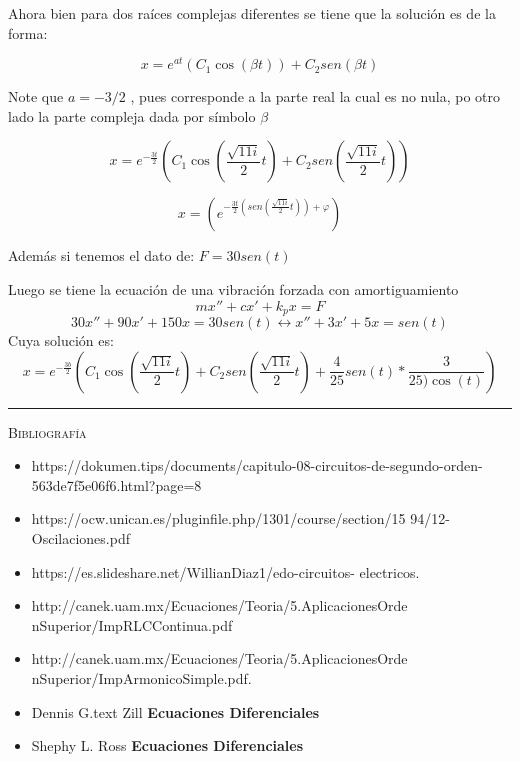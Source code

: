 \documentclass[oneside,12pt]{report}
\begin{document}
Ahora bien para dos  raíces complejas diferentes se tiene que  la solución es de la forma:

$$x=e^{at}\left( C_1 \cos(\beta t)\right) +C_2 sen\left( \beta t\right) $$

Note que   $a=-3/2$  , pues corresponde a la parte real la cual es  no nula,  po otro lado  la parte compleja  dada por símbolo  $\beta$

\begin{equation}
	x=e^{-\frac{3t}{2}}\left( C_1\cos\left( \frac{\sqrt{11i}}{2}t\right) +C_2 sen\left( \frac{\sqrt{11i}}{2}t\right) \right) 
\end{equation}

\begin{equation}
	x=\left( e^{-\frac{3t}{2} (sen(\frac{\sqrt{11i}}{2}t) )+\varphi}\right) 
\end{equation}
	
Además si tenemos el dato de:
 $F=30 sen(t)$

Luego se tiene la ecuación de una vibración forzada con  amortiguamiento 
\begin{equation}
	mx''+cx'+k_px=F
\end{equation}
\begin{equation}
	30x''+90x'+150x=30sen(t)\leftrightarrow x''+3x'+5x=sen(t)
\end{equation}
Cuya solución es:
\begin{equation}
	x=e^{-\frac{3b}{2}}\left( C_1\cos\left( \frac{\sqrt{11i}}{2}t\right) +C_2 sen\left( \frac{\sqrt{11i}}{2}t\right) +\frac{4}{25}sen(t)*\frac{3}{25)\cos(t)}\right) 
\end{equation}
\newpage
\thispagestyle{empty}\bigskip
\begin{center}\rule{0.9\textwidth}{0.1mm} \end{center}
{\sf
	\begin{center}
		\Large \textsc{Bibliografía}%
	\end{center}
}\bigskip
{\small \begin{itemize}
	\item https://dokumen.tips/documents/capitulo-08-circuitos-de-segundo-orden-563de7f5e06f6.html?page=8
	\item https://ocw.unican.es/pluginfile.php/1301/course/section/15 94/12-Oscilaciones.pdf
	\item https://es.slideshare.net/WillianDiaz1/edo-circuitos- electricos.
	\item 	http://canek.uam.mx/Ecuaciones/Teoria/5.AplicacionesOrde nSuperior/ImpRLCContinua.pdf
	\item http://canek.uam.mx/Ecuaciones/Teoria/5.AplicacionesOrde nSuperior/ImpArmonicoSimple.pdf.
	\item Dennis G.text Zill \textbf{Ecuaciones Diferenciales} 
	\item Shephy L. Ross \textbf{Ecuaciones Diferenciales}
\end{itemize}
}
\end{document}
